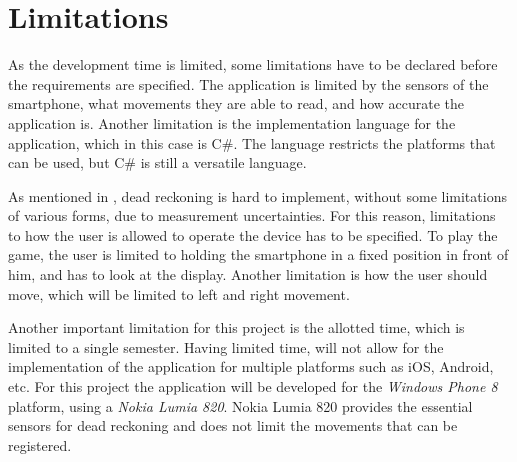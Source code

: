 \section{Limitations}\label{section:limitations}
As the development time is limited, some limitations have to be declared before the requirements are specified.
The application is limited by the sensors of the smartphone, what movements they are able to read, and how accurate the application is.
Another limitation is the implementation language for the application, which in this case is C\#.
The language restricts the platforms that can be used, but C\# is still a versatile language.

As mentioned in , dead reckoning is hard to implement, without some limitations of various forms, due to measurement uncertainties.
For this reason, limitations to how the user is allowed to operate the device has to be specified. 
To play the game, the user is limited to holding the smartphone in a fixed position in front of him, and has to look at the display.
Another limitation is how the user should move, which will be limited to left and right movement.

Another important limitation for this project is the allotted time, which is limited to a single semester. 
Having limited time, will not allow for the implementation of the application for multiple platforms such as iOS, Android, etc.
For this project the application will be developed for the \textit{Windows Phone 8} platform, using a \textit{Nokia Lumia 820}.
Nokia Lumia 820 provides the essential sensors for dead reckoning and does not limit the movements that can be registered.
